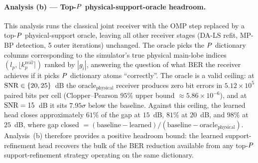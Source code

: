 \paragraph{Analysis (b) --- Top-$\Ppath$ physical-support-oracle headroom.}
This analysis runs the classical joint receiver with the OMP step replaced by a top-$\Ppath$ physical-support oracle, leaving all other receiver stages (DA-LS refit, MP-BP detection, 5 outer iterations) unchanged. The oracle picks the $\Ppath$ dictionary columns corresponding to the simulator's true physical main-lobe indices $(l_p, \lfloor k_p^\text{real}\rceil)$ ranked by $|g_i|$, answering the question of what BER the receiver achieves if it picks $\Ppath$ dictionary atoms ``correctly''. The oracle is a valid ceiling: at $\snr \in \{20, 25\}$~dB the oracle$_\text{physical}$ receiver produces zero bit errors in $5.12 \times 10^{5}$ paired bits per cell (Clopper--Pearson $95\%$ upper bound $\approx 5.86 \times 10^{-6}$), and at $\mathrm{SNR} = 15$~dB it sits $7.95\sigma$ below the baseline. Against this ceiling, the learned head closes approximately $61\%$ of the gap at $15$~dB, $81\%$ at $20$~dB, and $98\%$ at $25$~dB, where gap closed $= (\text{baseline} - \text{learned})/(\text{baseline} - \text{oracle}_\text{physical})$. Analysis~(b) therefore provides a positive headroom bound: the learned support-refinement head recovers the bulk of the BER reduction available from any top-$\Ppath$ support-refinement strategy operating on the same dictionary.

\begin{table}[t]
\centering
\caption{Top-$\Ppath$ physical-support-oracle diagnostic at $\fs = 4B$, 250 paired frames per cell (baseline and oracle share the same frames). The physical oracle picks dictionary atoms corresponding directly to the simulator's $(l_p, \lfloor k_p^\text{real}\rceil)$ main-lobe indices ranked by $|g_i|$, and provides a valid ceiling on what any top-$\Ppath$ support-refinement method can achieve. Gap closed $= (\text{baseline} - \text{learned}) / (\text{baseline} - \text{oracle}_\text{physical})$. The physical oracle's zeros at $\snr \in \{20, 25\}$~dB are censored observations: $0$ errors in $5.12 \times 10^{5}$ paired bits, Clopper--Pearson $95\%$ upper bound $\approx 5.86 \times 10^{-6}$.}
\label{tab:oraclehead}
\small
{}
\end{table}

